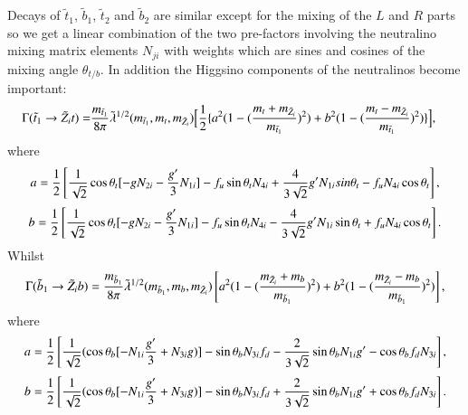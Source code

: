 \documentclass[final,3p,times,pdflatex]{elsarticle}
\begin{document}
Decays of $\tilde{t}_1$, $\tilde{b}_1$, $\tilde{t}_2$ and $\tilde{b}_2$ are
similar except for the mixing of the $L$ and $R$ parts so we get a linear
combination of the two pre-factors involving the neutralino mixing matrix
elements $N_{ji}$ with weights which are sines and cosines of the mixing angle
$\theta_{t/b}$. In addition the Higgsino components of the neutralinos become
important: 
\begin{equation}\label{t1tneut}
\begin{aligned}
\Gamma(\tilde{t}_1 \rightarrow \tilde{Z}_i t ) = & {m_{\tilde{t}_1} \over 8\pi}  \tilde{\lambda}^{1/2}(m_{\tilde{t}_1}, m_t, m_{\tilde{Z}_i}) \Big[\frac{1}{2}\{a^2(1-({m_t + m_{\tilde{Z}_i} \over m_{\tilde{t}_1}})^2) + b^2(1-({m_t - m_{\tilde{Z}_i} \over m_{\tilde{t}_1}})^2)\} \Big],
\end{aligned}
\end{equation} 
where
\begin{equation}
a = \frac{1}{2}\left[{1 \over \sqrt{2} }\cos\theta_{t}[-g N_{2i} - {g' \over 3} N_{1i}] - f_u \sin\theta_t N_{4i}  +  {4 \over 3\sqrt{2}} g' N_{1i} sin\theta_t - f_u N_{4i}\cos\theta_t\right],
\end{equation}
\begin{equation}
b = \frac{1}{2}\left[{1 \over \sqrt{2} }\cos\theta_{t}[-g N_{2i} - {g' \over 3} N_{1i}] - f_u \sin\theta_t N_{4i}  -  {4 \over 3\sqrt{2}} g' N_{1i}\sin\theta_t + f_u N_{4i}\cos\theta_t\right].
\end{equation}
Whilst
\begin{equation}\label{b1bneut}
\Gamma (\tilde{b}_1 \rightarrow \tilde{Z}_i b ) = {m_{\tilde{b}_1} \over 8\pi} \tilde{\lambda}^{1/2} (m_{\tilde{b}_1}, m_b, m_{\tilde{Z}_i}) \left[a^2 (1- ({m_{\tilde{Z}_i} + m_b \over m_{\tilde{b}_1}})^2) + b^2 (1- ({m_{\tilde{Z}_i} - m_b \over m_{\tilde{b}_1}})^2)\right],
\end{equation} 
where
\begin{equation}
\begin{aligned}
a = \frac{1}{2}\left[{1 \over \sqrt{2}}(\cos\theta_b[-N_{1i}{g' \over 3} + N_{3i}g)] - \sin\theta_b N_{3i}f_d - {2 \over 3\sqrt{2}}\sin{\theta_b}N_{1i}g' - \cos\theta_bf_d N_{3i}\right],
\end{aligned}
\end{equation}
\begin{equation}
\begin{aligned}
b = \frac{1}{2}\left[{1 \over \sqrt{2}}(\cos\theta_b[-N_{1i}{g' \over 3} + N_{3i}g)] - \sin\theta_b N_{3i}f_d + {2 \over 3\sqrt{2}}\sin{\theta_b}N_{1i}g' + \cos\theta_bf_d N_{3i}\right].
\end{aligned}
\end{equation}
\end{document}
